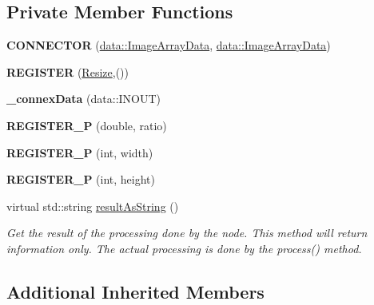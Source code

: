 \subsection*{Private Member Functions}
\begin{DoxyCompactItemize}
\item 
\mbox{\label{classfilter_1_1algos_1_1_resize_a11d2d47628dd7f9549a6392f0960c12e}} 
{\bfseries C\+O\+N\+N\+E\+C\+T\+OR} (\hyperlink{classfilter_1_1data_1_1_image_array_data}{data\+::\+Image\+Array\+Data}, \hyperlink{classfilter_1_1data_1_1_image_array_data}{data\+::\+Image\+Array\+Data})
\item 
\mbox{\label{classfilter_1_1algos_1_1_resize_a6cd1ac757d2ca222ffa765bbcdbbd5ed}} 
{\bfseries R\+E\+G\+I\+S\+T\+ER} (\hyperlink{classfilter_1_1algos_1_1_resize}{Resize},())
\item 
\mbox{\label{classfilter_1_1algos_1_1_resize_afd7ccd4af697826014e18e94d350ddea}} 
{\bfseries \+\_\+connex\+Data} (data\+::\+I\+N\+O\+UT)
\item 
\mbox{\label{classfilter_1_1algos_1_1_resize_ac3492e9a0dc66a5e0459b82b2a20fdbe}} 
{\bfseries R\+E\+G\+I\+S\+T\+E\+R\+\_\+P} (double, ratio)
\item 
\mbox{\label{classfilter_1_1algos_1_1_resize_a3ea85b7f206bba567ed31b80f9136f85}} 
{\bfseries R\+E\+G\+I\+S\+T\+E\+R\+\_\+P} (int, width)
\item 
\mbox{\label{classfilter_1_1algos_1_1_resize_ad682a4cb773010cbf3f62d3ed30231bf}} 
{\bfseries R\+E\+G\+I\+S\+T\+E\+R\+\_\+P} (int, height)
\item 
virtual std\+::string \hyperlink{classfilter_1_1algos_1_1_resize_a5f4bc6f31fd5d759f1216ce60b1358b0}{result\+As\+String} ()
\begin{DoxyCompactList}\small\item\em Get the result of the processing done by the node. This method will return information only. The actual processing is done by the process() method. \end{DoxyCompactList}\end{DoxyCompactItemize}
\subsection*{Additional Inherited Members}


